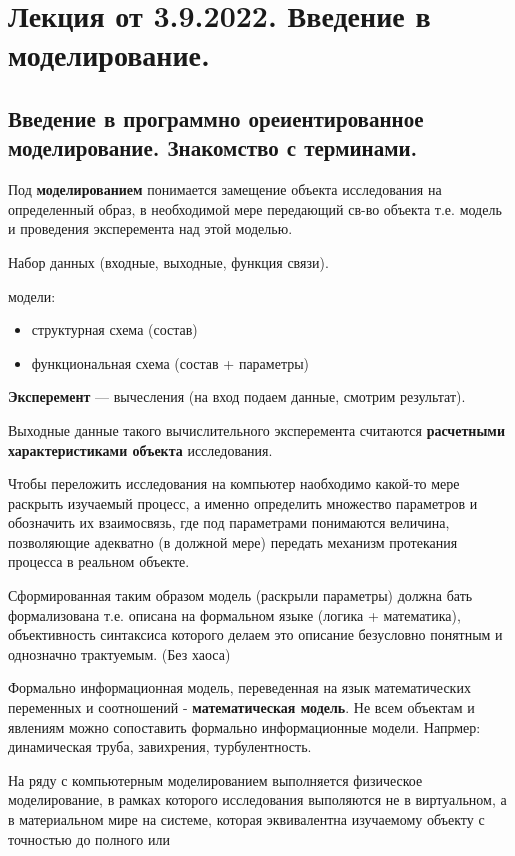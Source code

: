 \section{Лекция от 3.9.2022. Введение в моделирование.}
\subsection{Введение в программно ореиентированное моделирование. Знакомство с
терминами.}
Под \textbf{моделированием} понимается замещение объекта исследования на 
определенный образ, в необходимой мере передающий св-во объекта т.е. модель 
и проведения эксперемента над этой моделью.\par
Набор данных (входные, выходные, функция связи).\\
{ модели:
  \begin{itemize}
    \item структурная схема (состав)
    \item функциональная схема (состав + параметры)
  \end{itemize}}
\textbf{Эксперемент} --- вычесления (на вход подаем данные, смотрим
результат).\par
Выходные данные такого вычислительного эксперемента считаются \textbf{расчетными
характеристиками объекта} исследования.\par
Чтобы переложить исследования на компьютер наобходимо какой-то мере раскрыть
изучаемый процесс, а именно определить множество параметров и обозначить их
взаимосвязь, где под параметрами понимаются величина, позволяющие адекватно (в
должной мере) передать механизм протекания процесса в реальном объекте.\par
Сформированная таким образом модель (раскрыли параметры) должна бать
формализована т.е. описана на формальном языке (логика + математика),
объективность синтаксиса которого делаем это описание безусловно понятным и
однозначно трактуемым. (Без хаоса)\par
Формально информационная модель, переведенная на язык математических переменных
и соотношений - \textbf{математическая модель}.
Не всем объектам и явлениям можно сопоставить формально информационные модели.
Напрмер: динамическая труба, завихрения, турбулентность.\par
На ряду с компьютерным моделированием выполняется физическое моделирование, в
рамках которого исследования выполяются не в виртуальном, а в материальном мире
на системе, которая эквивалентна изучаемому объекту с точностью до полного или
